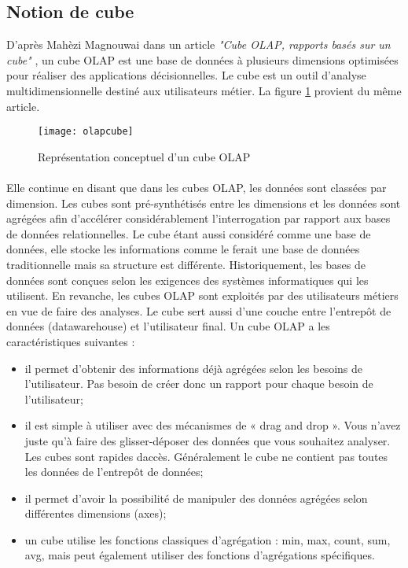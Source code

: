 \subsection{Notion de cube}
D'après Mahèzi Magnouwai dans un article \textit{"Cube OLAP, rapports basés sur un cube"} \cite{WEBSITE:6}, un cube OLAP est une base de données à plusieurs dimensions optimisées pour réaliser des applications décisionnelles. Le cube est un outil d’analyse multidimensionnelle destiné aux utilisateurs métier. La figure \ref{fig:olapcube} provient du même article.

\begin{figure}[H]
    \centering
    \texttt{[image: olapcube]}
    \caption{Représentation conceptuel d'un cube OLAP}
    \label{fig:olapcube}
\end{figure}

\paragraph{}
Elle continue en disant que dans les cubes OLAP, les données sont classées par dimension. Les cubes sont pré-synthétisés entre les dimensions et les données sont agrégées afin d’accélérer considérablement l’interrogation par rapport aux bases de données relationnelles. Le cube étant aussi considéré comme une base de données, elle stocke les informations comme le ferait une base de données traditionnelle mais sa structure est différente. Historiquement, les bases de données sont conçues selon les exigences des systèmes informatiques qui les utilisent. En revanche, les cubes OLAP sont exploités par des utilisateurs métiers en vue de faire des analyses. Le cube sert aussi d’une couche entre l’entrepôt de données (datawarehouse) et l’utilisateur final. Un cube OLAP a les caractéristiques suivantes :
\begin{itemize}
    \item il permet d’obtenir des informations déjà agrégées selon les besoins de l’utilisateur. Pas besoin de créer donc un rapport pour chaque besoin de l’utilisateur;
    \item il est simple à utiliser avec des mécanismes de « drag and drop ». Vous n’avez juste qu’à faire des glisser-déposer des données que vous souhaitez analyser. Les cubes sont rapides daccès. Généralement le cube ne contient pas toutes les données de l’entrepôt de données;
    \item il permet d'avoir la possibilité de manipuler des données agrégées selon différentes dimensions (axes);
    \item un cube utilise les fonctions classiques d’agrégation : min, max, count, sum, avg, mais peut également utiliser des fonctions d’agrégations spécifiques.
\end{itemize}
